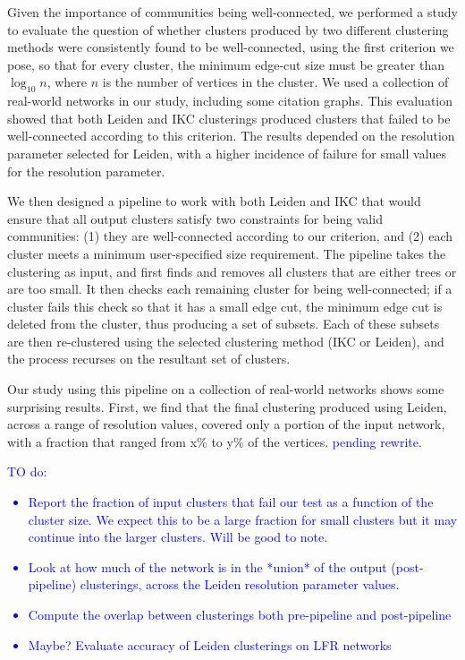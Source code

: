 \documentclass[12pt, oneside]{article}   	%
\begin{document}
Given the importance of communities being well-connected, we performed a study to evaluate the question of whether clusters produced by two different clustering methods
were consistently found to be well-connected, using the first criterion we pose, so that for every cluster, the minimum edge-cut size must be greater than $\log_{10}n$, where $n$ is the number of vertices in the cluster. 
We used a collection of real-world networks in our study, including some citation graphs.
This evaluation showed that both Leiden and IKC clusterings produced clusters that failed to be well-connected according to this criterion.
The results depended on the resolution parameter selected for Leiden,  with a higher incidence of failure for small values for the resolution parameter.

We then designed a pipeline to work with both Leiden and IKC that would ensure that all output clusters satisfy two constraints for being valid communities: (1) they are well-connected according to our criterion, and (2) each cluster meets a minimum user-specified size requirement. The pipeline takes the clustering as input, and first finds and removes all clusters that are either trees or are too small.  It then checks each remaining cluster for being well-connected; if a cluster fails this check so that it has a small edge cut, the minimum edge cut is deleted from the cluster, thus producing a set of subsets.  Each of these subsets are then re-clustered using the selected clustering method (IKC or Leiden), and the process recurses on the resultant set of clusters.

Our study using this pipeline on a collection of real-world networks shows some surprising results. First, we find that the final clustering produced using Leiden, across a range of resolution values, 
covered only a portion of the input network, with a  fraction that ranged from x\% to y\% of the vertices. \textcolor{blue}{pending rewrite}.

\textcolor{blue}{TO do:
\begin{itemize}
\item Report the fraction of input clusters that fail our test as a function of the cluster size.
We expect this to be a large fraction for small clusters but it may continue into the larger clusters.
Will be good to note.
\item Look at how much of the network is in the *union* of the output (post-pipeline) clusterings, across the Leiden resolution parameter values.
\item Compute the overlap between clusterings both pre-pipeline and post-pipeline
\item  Maybe? Evaluate accuracy of Leiden clusterings on LFR networks 
\end{itemize}
}
\end{document}
